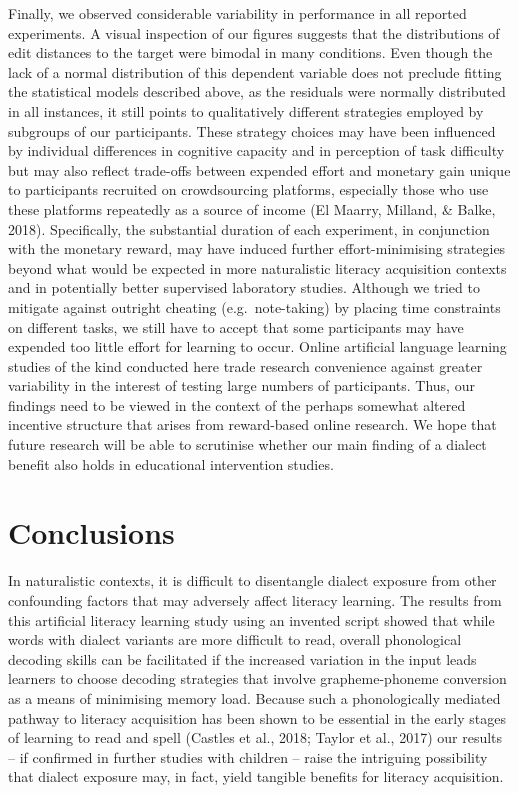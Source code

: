 \documentclass[doc,floatsintext]{apa6}
\begin{document}
Finally, we observed considerable variability in performance in all
reported experiments. A visual inspection of our figures suggests that
the distributions of edit distances to the target were bimodal in many
conditions. Even though the lack of a normal distribution of this
dependent variable does not preclude fitting the statistical models
described above, as the residuals were normally distributed in all
instances, it still points to qualitatively different strategies
employed by subgroups of our participants. These strategy choices may
have been influenced by individual differences in cognitive capacity and
in perception of task difficulty but may also reflect trade-offs between
expended effort and monetary gain unique to participants recruited on
crowdsourcing platforms, especially those who use these platforms
repeatedly as a source of income (El Maarry, Milland, \& Balke, 2018).
Specifically, the substantial duration of each experiment, in
conjunction with the monetary reward, may have induced further
effort-minimising strategies beyond what would be expected in more
naturalistic literacy acquisition contexts and in potentially better
supervised laboratory studies. Although we tried to mitigate against
outright cheating (e.g.~note-taking) by placing time constraints on
different tasks, we still have to accept that some participants may have
expended too little effort for learning to occur. Online artificial
language learning studies of the kind conducted here trade research
convenience against greater variability in the interest of testing large
numbers of participants. Thus, our findings need to be viewed in the
context of the perhaps somewhat altered incentive structure that arises
from reward-based online research. We hope that future research will be
able to scrutinise whether our main finding of a dialect benefit also
holds in educational intervention studies.

\section{Conclusions}\label{conclusions}

In naturalistic contexts, it is difficult to disentangle dialect
exposure from other confounding factors that may adversely affect
literacy learning. The results from this artificial literacy learning
study using an invented script showed that while words with dialect
variants are more difficult to read, overall phonological decoding
skills can be facilitated if the increased variation in the input leads
learners to choose decoding strategies that involve grapheme-phoneme
conversion as a means of minimising memory load. Because such a
phonologically mediated pathway to literacy acquisition has been shown
to be essential in the early stages of learning to read and spell
(Castles et al., 2018; Taylor et al., 2017) our results -- if confirmed
in further studies with children -- raise the intriguing possibility
that dialect exposure may, in fact, yield tangible benefits for literacy
acquisition.
\end{document}
